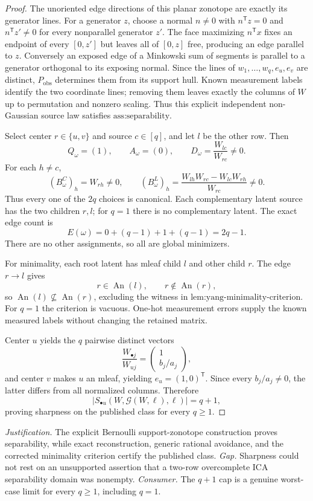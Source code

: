 \documentclass{article}
\begin{document}
\begin{proof}
The unoriented edge directions of this planar zonotope are exactly its generator lines. For a generator \(z\), choose a normal \(n\ne0\) with \(n^{\mathsf T}z=0\) and \(n^{\mathsf T}z'\ne0\) for every nonparallel generator \(z'\). The face maximizing \(n^{\mathsf T}x\) fixes an endpoint of every \([0,z']\) but leaves all of \([0,z]\) free, producing an edge parallel to \(z\). Conversely an exposed edge of a Minkowski sum of segments is parallel to a generator orthogonal to its exposing normal. Since the lines of \(w_1,\ldots,w_q,e_u,e_v\) are distinct, \(P_{\mathrm{obs}}\) determines them from its support hull. Known measurement labels identify the two coordinate lines; removing them leaves exactly the columns of \(W\) up to permutation and nonzero scaling. Thus this explicit independent non-Gaussian source law satisfies \(\text{ass:separability}\).

Select center \(r\in\{u,v\}\) and source \(c\in[q]\), and let \(l\) be the other row. Then
\[
Q_\omega=(1),\qquad A_\omega=(0),\qquad D_\omega=\frac{W_{lc}}{W_{rc}}\ne0.
\]
For each \(h\ne c\),
\[
(B^C_\omega)_h=W_{rh}\ne0,
\qquad
(B^L_\omega)_h
=\frac{W_{lh}W_{rc}-W_{lc}W_{rh}}{W_{rc}}\ne0.
\]
Thus every one of the \(2q\) choices is canonical. Each complementary latent source has the two children \(r,l\); for \(q=1\) there is no complementary latent. The exact edge count is
\[
E(\omega)=0+(q-1)+1+(q-1)=2q-1.
\]
There are no other assignments, so all are global minimizers.

For minimality, each root latent has mleaf child \(l\) and other child \(r\). The edge \(r\to l\) gives
\[
r\in\operatorname{An}(l),\qquad r\notin\operatorname{An}(r),
\]
so \(\operatorname{An}(l)\nsubseteq\operatorname{An}(r)\), excluding the witness in \(\text{lem:yang-minimality-criterion}\). For \(q=1\) the criterion is vacuous. One-hot measurement errors supply the known measured labels without changing the retained matrix.

Center \(u\) yields the \(q\) pairwise distinct vectors
\[
\frac{W_{\bullet j}}{W_{uj}}=\begin{pmatrix}1\\b_j/a_j\end{pmatrix},
\]
and center \(v\) makes \(u\) an mleaf, yielding \(e_u=(1,0)^{\mathsf T}\). Since every \(b_j/a_j\ne0\), the latter differs from all normalized columns. Therefore
\[
|S_{\bullet u}(W,\mathcal G(W,\ell),\ell)|=q+1,
\]
proving sharpness on the published class for every \(q\ge1\).
\end{proof}
\par\smallskip\noindent \textit{Justification.} The explicit Bernoulli support-zonotope construction proves separability, while exact reconstruction, generic rational avoidance, and the corrected minimality criterion certify the published class. \textit{Gap.} Sharpness could not rest on an unsupported assertion that a two-row overcomplete ICA separability domain was nonempty. \textit{Consumer.} The \(q+1\) cap is a genuine worst-case limit for every \(q\ge1\), including \(q=1\).
\end{document}
